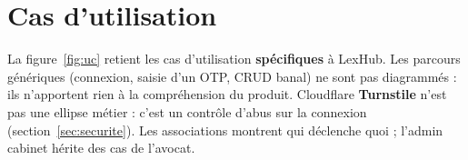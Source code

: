 \section{Cas d'utilisation}
\label{sec:uc}

La figure~\ref{fig:uc} retient les cas d'utilisation \textbf{spécifiques} à LexHub. Les parcours génériques (connexion, saisie d'un OTP, CRUD banal) ne sont pas diagrammés : ils n'apportent rien à la compréhension du produit. Cloudflare \textbf{Turnstile} n'est pas une ellipse métier : c'est un contrôle d'abus sur la connexion (section~\ref{sec:securite}). Les associations montrent qui déclenche quoi ; l'admin cabinet hérite des cas de l'avocat.

\begin{figure}[H]
\centering
{}
\end{figure}
